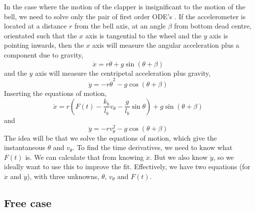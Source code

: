 \documentclass{article}
\begin{document}
In the case where the motion of the clapper is insignificant to the motion of the bell, we
need to solve only the pair of first order ODE's .
If the accelerometer is located at a distance $r$ from the bell axis, 
at an angle $\beta$ from bottom dead centre,
orientated such that the $x$ axis is tangential to the wheel and the $y$ axis is pointing
inwards, then the $x$ axis will measure the angular acceleration plus a component due to gravity,
\begin{equation}
\ddot{x} = r \ddot{\theta} + g \sin (\theta + \beta)
\end{equation}
and the $y$ axis will measure the centripetal acceleration plus gravity,
\begin{equation}
\ddot{y} = -r \dot{\theta}^2 - g \cos (\theta  + \beta)
\end{equation}
Inserting the equations of motion,
\begin{equation}
\ddot{x} = r \left(F(t) - \frac{k_b}{l_b}v_\theta - \frac{g}{l_b}\sin \theta \right) 
   + g \sin (\theta + \beta)
\end{equation}
and
\begin{equation}
\ddot{y} = -r v_\theta^2 - g \cos (\theta  + \beta)
\end{equation}
The idea will be that we solve the equations of motion, which give the instantaneous
$\theta$ and $v_\theta$. To find the time derivatives, we need to know what $F(t)$ is. 
We can calculate that from knowing $\ddot{x}$. But we also know $\ddot{y}$, so we ideally
want to use this to improve the fit. Effectively, we have two equations (for $\ddot{x}$ and
$\ddot{y}$), with three unknowns, $\theta$, $v_\theta$ and $F(t)$. 

\subsection{Free case}
\end{document}
